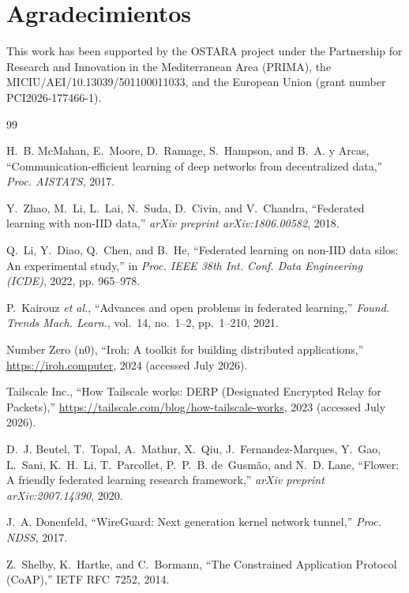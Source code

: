 \documentclass[journal]{IEEEtran}
\begin{document}
\section*{Agradecimientos}
This work has been supported by the OSTARA project under the Partnership for Research and Innovation in the Mediterranean Area (PRIMA), the MICIU/AEI/10.13039/501100011033, and the European Union (grant number PCI2026-177466-1).

\begin{thebibliography}{99}

H.~B. McMahan, E.~Moore, D.~Ramage, S.~Hampson, and B.~A. y Arcas,
``Communication-efficient learning of deep networks from decentralized data,''
\emph{Proc. AISTATS}, 2017.

Y.~Zhao, M.~Li, L.~Lai, N.~Suda, D.~Civin, and V.~Chandra,
``Federated learning with non-IID data,''
\emph{arXiv preprint arXiv:1806.00582}, 2018.

Q.~Li, Y.~Diao, Q.~Chen, and B.~He,
``Federated learning on non-IID data silos: An experimental study,''
in \emph{Proc. IEEE 38th Int. Conf. Data Engineering (ICDE)}, 2022, pp. 965--978.

P.~Kairouz \emph{et al.},
``Advances and open problems in federated learning,''
\emph{Found. Trends Mach. Learn.}, vol.~14, no.~1--2, pp.~1--210, 2021.

Number Zero (n0),
``Iroh: A toolkit for building distributed applications,''
\url{https://iroh.computer}, 2024 (accessed July 2026).

Tailscale Inc.,
``How Tailscale works: DERP (Designated Encrypted Relay for Packets),''
\url{https://tailscale.com/blog/how-tailscale-works}, 2023 (accessed July 2026).

D.~J. Beutel, T.~Topal, A.~Mathur, X.~Qiu, J.~Fernandez-Marques, Y.~Gao, L.~Sani, K.~H.~Li, T.~Parcollet, P.~P.~B. de~Gusm\~ao, and N.~D. Lane,
``Flower: A friendly federated learning research framework,''
\emph{arXiv preprint arXiv:2007.14390}, 2020.

J.~A. Donenfeld,
``WireGuard: Next generation kernel network tunnel,''
\emph{Proc. NDSS}, 2017.

Z.~Shelby, K.~Hartke, and C.~Bormann,
``The Constrained Application Protocol (CoAP),''
IETF RFC~7252, 2014.


\end{thebibliography}
\end{document}

